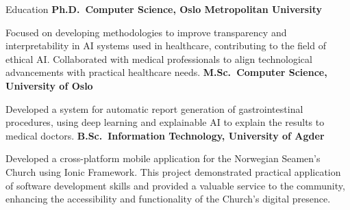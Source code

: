 \begin{rubric}{Education}
\entry*[2018 -- 2022]%
\textbf{Ph.D.~Computer Science, Oslo Metropolitan University} \par
Focused on developing methodologies to improve transparency and interpretability in AI systems used in healthcare, contributing to the field of ethical AI.
Collaborated with medical professionals to align technological advancements with practical healthcare needs.
%
\entry*[2016 -- 2018]%
\textbf{M.Sc.~Computer Science, University of Oslo} \par
Developed a system for automatic report generation of gastrointestinal procedures, using deep learning and explainable AI to explain the results to medical doctors.
% 
\entry*[2012 -- 2015]%
\textbf{B.Sc.~Information Technology, University of Agder} \par
Developed a cross-platform mobile application for the Norwegian Seamen's Church using Ionic Framework. This project demonstrated practical application of software development skills and provided a valuable service to the community, enhancing the accessibility and functionality of the Church's digital presence.
\end{rubric}